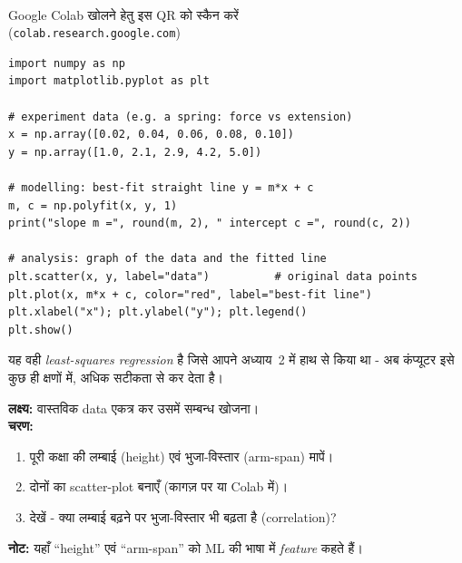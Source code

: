 \begin{center}
\\[3pt]
{\footnotesize\sffamily\color{aigrey} Google Colab खोलने हेतु इस QR को स्कैन करें\\
(\nolinkurl{colab.research.google.com})}
\end{center}

\begin{lstlisting}
import numpy as np
import matplotlib.pyplot as plt

# experiment data (e.g. a spring: force vs extension)
x = np.array([0.02, 0.04, 0.06, 0.08, 0.10])
y = np.array([1.0, 2.1, 2.9, 4.2, 5.0])

# modelling: best-fit straight line y = m*x + c
m, c = np.polyfit(x, y, 1)
print("slope m =", round(m, 2), " intercept c =", round(c, 2))

# analysis: graph of the data and the fitted line
plt.scatter(x, y, label="data")          # original data points
plt.plot(x, m*x + c, color="red", label="best-fit line")
plt.xlabel("x"); plt.ylabel("y"); plt.legend()
plt.show()
\end{lstlisting}

\noindent यह वही \emph{least-squares regression} है जिसे आपने अध्याय~2 में हाथ से किया
था - अब कंप्यूटर इसे कुछ ही क्षणों में, अधिक सटीकता से कर देता है।

\begin{gatividhi}
\textbf{लक्ष्य:} वास्तविक data एकत्र कर उसमें सम्बन्ध खोजना।\\[4pt]
\textbf{चरण:}
\begin{enumerate}[leftmargin=1.6em]
  \item पूरी कक्षा की लम्बाई (height) एवं भुजा-विस्तार (arm-span) मापें।
  \item दोनों का scatter-plot बनाएँ (कागज़ पर या Colab में)।
  \item देखें - क्या लम्बाई बढ़ने पर भुजा-विस्तार भी बढ़ता है (correlation)?
\end{enumerate}
\textbf{नोट:} यहाँ “height” एवं “arm-span” को ML की भाषा में \emph{feature} कहते हैं।
\end{gatividhi}


